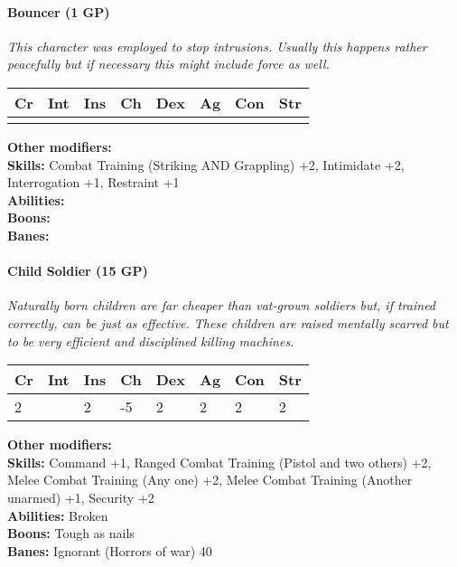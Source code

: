 \hrulefill
\paragraph*{Bouncer (1 GP)}
\textit{This character was employed to stop intrusions. Usually this happens rather peacefully but if necessary this might include force as well.}\par
\begin{tabular}{|l|l|l|l|l|l|l|l|}
	\hline
	Cr & Int & Ins & Ch & Dex & Ag & Con & Str \\ \hline
	&  &  &  &  &  &  &  \\ \hline
\end{tabular}\par
\noindent\textbf{Other modifiers:} \\
\textbf{Skills:} Combat Training (Striking AND Grappling) +2,
Intimidate +2,
Interrogation +1,
Restraint +1\\
\textbf{Abilities:} \\
\textbf{Boons:} \\
\textbf{Banes:} \\

\hrulefill
\paragraph*{Child Soldier (15 GP)}
\textit{Naturally born children are far cheaper than vat-grown soldiers but, if trained correctly, can be just as effective. These children are raised mentally scarred but to be very efficient and disciplined killing machines.}\par
\begin{tabular}{|l|l|l|l|l|l|l|l|}
	\hline
	Cr & Int & Ins & Ch & Dex & Ag & Con & Str \\ \hline
	2 &  & 2 & -5 & 2 & 2 & 2 & 2 \\ \hline
\end{tabular}\par
\noindent\textbf{Other modifiers:} \\
\textbf{Skills:} Command +1,
Ranged Combat Training (Pistol and two others) +2,
Melee Combat Training (Any one) +2,
Melee Combat Training (Another unarmed) +1,
Security +2\\
\textbf{Abilities:} Broken\\
\textbf{Boons:} Tough as nails\\
\textbf{Banes:} Ignorant (Horrors of war) 40\\

\hrulefill
